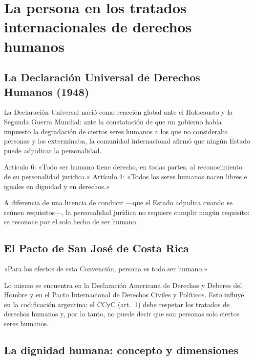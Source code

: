 \documentclass[12pt,oneside]{book}
\begin{document}
\section{La persona en los tratados internacionales de derechos humanos}

\subsection{La Declaración Universal de Derechos Humanos (1948)}

La Declaración Universal nació como reacción global ante el Holocausto y la Segunda Guerra Mundial: ante la constatación de que un gobierno había impuesto la degradación de ciertos seres humanos a los que no consideraba personas y los exterminaba, la comunidad internacional afirmó que ningún Estado puede adjudicar la personalidad.

\begin{importante}
Artículo 6: «Todo ser humano tiene derecho, en todas partes, al reconocimiento de su personalidad jurídica.»
Artículo 1: «Todos los seres humanos nacen libres e iguales en dignidad y en derechos.»
\end{importante}

A diferencia de una licencia de conducir ---que el Estado adjudica cuando se reúnen requisitos---, la personalidad jurídica no requiere cumplir ningún requisito: se reconoce por el solo hecho de ser humano.

\subsection{El Pacto de San José de Costa Rica}

\begin{regla}
«Para los efectos de esta Convención, persona es todo ser humano.»
\end{regla}

Lo mismo se encuentra en la Declaración Americana de Derechos y Deberes del Hombre y en el Pacto Internacional de Derechos Civiles y Políticos. Esto influye en la codificación argentina: el CCyC (art.~1) debe respetar los tratados de derechos humanos y, por lo tanto, no puede decir que son personas solo ciertos seres humanos.

\subsection{La dignidad humana: concepto y dimensiones}
\end{document}
